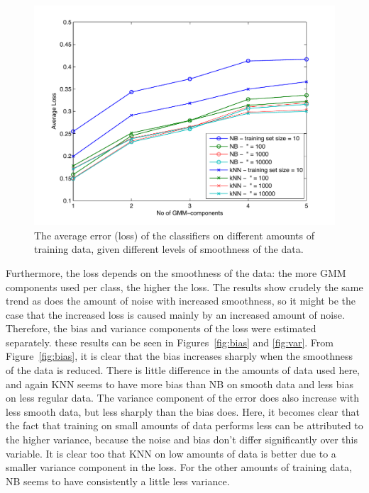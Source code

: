 \documentclass[a4paper]{article}
\begin{document}
\begin{figure}[htb]
    \centering
    \includegraphics[width=.9\textwidth]{loss_vs.pdf}
    \caption{The average error (loss) of the classifiers on different amounts of training data, given different levels of smoothness of the data. \label{fig:loss}}
\end{figure}

Furthermore, the loss depends on the smoothness of the data: the more GMM components used per class, the higher the loss. The results show crudely the same trend as does the amount of noise with increased smoothness, so it might be the case that the increased loss is caused mainly by an increased amount of noise. Therefore, the bias and variance components of the loss were estimated separately. these results can be seen in Figures~\ref{fig:bias} and \ref{fig:var}. From Figure~\ref{fig:bias}, it is clear that the bias increases sharply when the smoothness of the data is reduced. There is little difference in the amounts of data used here, and again KNN seems to have more bias than NB on smooth data and less bias on less regular data. The variance component of the error does also increase with less smooth data, but less sharply than the bias does. Here, it becomes clear that the fact that training on small amounts of data performs less can be attributed to the higher variance, because the noise and bias don't differ significantly over this variable. It is clear too that KNN on low amounts of data is better due to a smaller variance component in the loss. For the other amounts of training data, NB seems to have consistently a little less variance.
\end{document}

